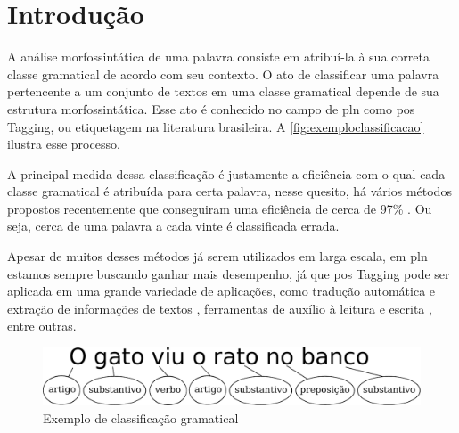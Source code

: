 \chapter{Introdução}\label{introducao}

A análise morfossintática de uma palavra consiste em atribuí-la à sua correta classe gramatical de acordo com seu contexto. O ato de classificar uma palavra pertencente a um conjunto de textos em uma classe gramatical depende de sua estrutura morfossintática. Esse ato é conhecido no campo de \ac{pln} como \ac{pos} Tagging, ou etiquetagem na literatura brasileira. A \autoref{fig:exemploclassificacao} ilustra esse processo. 


A principal medida dessa classificação é justamente a eficiência com o qual cada classe gramatical é atribuída para certa palavra, nesse quesito, há vários métodos propostos recentemente que conseguiram uma eficiência de cerca de 97\% \cite{dos2014training, collobert2011deep, fonseca2015evaluating}. Ou seja, cerca de uma palavra a cada vinte é classificada errada. 

Apesar de muitos desses métodos já serem utilizados em larga escala, em \ac{pln} estamos sempre buscando ganhar mais desempenho, já que \ac{pos} Tagging pode ser aplicada em uma grande variedade de aplicações, como tradução automática e extração de informações de textos \cite{manning1999foundations}, ferramentas de auxílio à leitura e escrita \cite{marquiafavel2010processo}, entre outras.

\begin{figure}[htb]
  \caption{Exemplo de classificação gramatical}\label{fig:exemploclassificacao}
  \begin{center}
      \includegraphics[scale=0.75]{img/exemploclassificacao.pdf}
  \end{center}
\end{figure}


